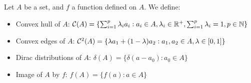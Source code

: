 








\subsection{}
\label{sec:proof_pi_hull}
\begin{definition}
Let $A$ be a set, and $f$ a function defined on $A$. We define:

\begin{itemize}
    \item Convex hull of $A$: $\mathcal{C}(A) = \{\sum_{i=1}^p \lambda_i a_i: a_i\in A, \lambda_i\in\mathbb{R}^+, \sum_{i=1}^p \lambda_i = 1, p\in\mathbb{N}\}$
    \item Convex edges of $A$: $\mathcal{C}^2(A) = \{\lambda a_1 + (1-\lambda)a_2: a_1, a_2\in A, \lambda\in[0, 1]\}$
    \item Dirac distributions of $A$: $\delta(A) = \{\delta(a-a_0): a_0\in A\}$ 
    \item Image of $A$ by $f$: $f(A) = \{f(a): a\in A\}$
\end{itemize}
\end{definition}

